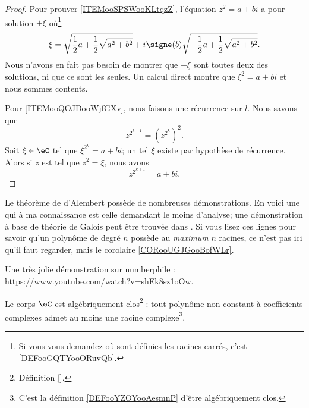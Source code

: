 \begin{proof}
	Pour prouver \ref{ITEMooSPSWooKLtqzZ}, l'équation \( z^2=a+bi\) a pour solution \( \pm\xi\) où\footnote{Si vous vous demandez où sont définies les racines carrés, c'est \ref{DEFooGQTYooORuvQb}.}
	\begin{equation}
		\xi=\sqrt{ \frac{ 1 }{2}a+\frac{ 1 }{2}\sqrt{ a^2+b^2 } }+i\signe(b)\sqrt{ -\frac{ 1 }{2}a+\frac{ 1 }{2}\sqrt{ a^2+b^2 } }.
	\end{equation}
	Nous n'avons en fait pas besoin de montrer que \( \pm\xi\) sont toutes deux des solutions, ni que ce sont les seules. Un calcul direct montre que \( \xi^2=a+bi\) et nous sommes contents.

	Pour \ref{ITEMooQOJDooWjfGXv}, nous faisons une récurrence sur \( l\). Nous savons que
	\begin{equation}
		z^{2^{k+1}}=(z^{2^k})^2.
	\end{equation}
	Soit \( \xi\in \eC\) tel que \( \xi^{2^k}=a+bi\); un tel \( \xi\) existe par hypothèse de récurrence. Alors si \( z\) est tel que \( z^2=\xi\), nous avons
	\begin{equation}
		z^{2^{k+1}}=a+bi.
	\end{equation}
\end{proof}

Le théorème de d'Alembert possède de nombreuses démonstrations. En voici une qui à ma connaissance est celle demandant le moins d'analyse; une démonstration à base de théorie de Galois peut être trouvée dans \cite{rqrNyg,ooPSLMooAVODjn}. Si vous lisez ces lignes pour savoir qu'un polynôme de degré \( n\) possède au \emph{maximum} \( n\) racines, ce n'est pas ici qu'il faut regarder, mais le corolaire \ref{CORooUGJGooBofWLr}.

Une très jolie démonstration sur numberphile :\\ \url{https://www.youtube.com/watch?v=shEk8sz1oOw}.

\begin{theorem}   \label{THOooIRJYooBiHRyW}
	Le corps \( \eC\) est algébriquement clos\footnote{Définition \ref{}.} : tout polynôme non constant à coefficients complexes admet au moins une racine complexe\footnote{C'est la définition \ref{DEFooYZOYooAesmnP} d'être algébriquement clos.}.
\end{theorem}

